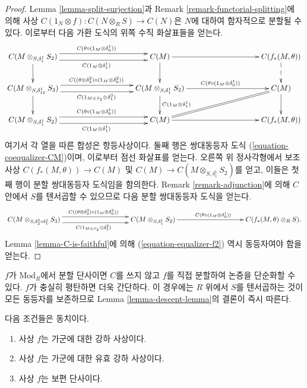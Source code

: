 \begin{proof}
Lemma \ref{lemma-split-surjection}과
Remark \ref{remark-functorial-splitting}에 의해 사상
$C(1_N \otimes f): C(N \otimes_R S) \to C(N)$은 $N$에 대하여 함자적으로
분할될 수 있다. 이로부터 다음 가환 도식의 위쪽 수직 화살표들을 얻는다.
$$
\xymatrix@C=8pc{
C(M \otimes_{S, \delta_1^1} S_2)
\ar@<1ex>^{C(\theta \circ (1_M \otimes \delta_0^1))}[r]
\ar@<-1ex>_{C(1_M \otimes \delta_1^1)}[r] \ar[d] &
C(M) \ar[r]\ar[d] & C(f_*(M,\theta)) \ar@{-->}[d] \\
C(M \otimes_{S,\delta_{12}^1} S_3)
\ar@<1ex>^{C((\theta \otimes \delta_2^2) \circ (1_M \otimes \delta^2_0))}[r]
\ar@<-1ex>_{C(1_{M \otimes S_2} \otimes \delta^2_1)}[r] \ar[d] &
C(M \otimes_{S, \delta_1^1} S_2 )
\ar[r]^{C(\theta \circ (1_M \otimes \delta_0^1))}
\ar[d]^{C(1_M \otimes \delta_1^1)} &
C(M) \ar[d] \ar@{=}[dl] \\
C(M \otimes_{S, \delta_1^1} S_2)
\ar@<1ex>[r]^{C(\theta \circ (1_M \otimes \delta_0^1))}
\ar@<-1ex>[r]_{C(1_M \otimes \delta_1^1)} &
C(M) \ar[r] &
C(f_*(M,\theta))
}
$$
여기서 각 열을 따른 합성은 항등사상이다.
둘째 행은 쌍대동등자 도식 (\ref{equation-coequalizer-CM})이며, 이로부터
점선 화살표를 얻는다. 오른쪽 위 정사각형에서 보조 사상
$C(f_*(M,\theta)) \to C(M)$ 및
$C(M) \to C(M\otimes_{S,\delta_1^1} S_2)$를 얻고, 이들은 첫째 행이
분할 쌍대동등자 도식임을 함의한다.
Remark \ref{remark-adjunction}에 의해 $C$ 안에서 $S$를 텐서곱할 수 있으므로
다음 분할 쌍대동등자 도식을 얻는다.
$$
\xymatrix@C=8pc{
C(M \otimes_{S,\delta_2^2 \circ \delta_1^1} S_3)
\ar@<1ex>^{C((\theta \otimes \delta_2^2) \circ (1_M \otimes \delta^2_0))}[r] 
\ar@<-1ex>_{C(1_{M \otimes S_2} \otimes \delta^2_1)}[r] &
C(M \otimes_{S, \delta_1^1} S_2 )
\ar[r]^{C(\theta \circ (1_M \otimes \delta_0^1))} &
C(f_*(M,\theta) \otimes_R S).
}
$$
Lemma \ref{lemma-C-is-faithful}에 의해
(\ref{equation-equalizer-f2}) 역시 동등자여야 함을 얻는다.
\end{proof}

\begin{remark}
\label{remark-descent-lemma}
$f$가 $\text{Mod}_R$에서 분할 단사이면 $C$를 쓰지 않고 $f$를 직접
분할하여 논증을 단순화할 수 있다. $f$가 충실히 평탄하면 더욱 간단하다.
이 경우에는 $R$ 위에서 $S$를 텐서곱하는 것이 모든 동등자를 보존하므로
Lemma \ref{lemma-descent-lemma}의 결론이 즉시 따른다.
\end{remark}

\begin{theorem}
\label{theorem-descent}
다음 조건들은 동치이다.
\begin{enumerate}
\item[(a)] 사상 $f$는 가군에 대한 강하 사상이다.
\item[(b)] 사상 $f$는 가군에 대한 유효 강하 사상이다.
\item[(c)] 사상 $f$는 보편 단사이다.
\end{enumerate}
\end{theorem}

